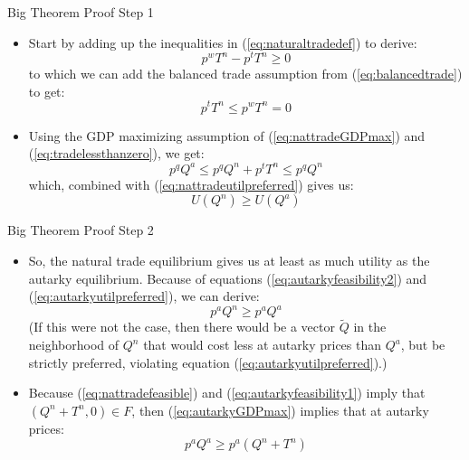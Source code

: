 \documentclass[aspectratio=169]{beamer}
\begin{document}
\begin{frame}{Big Theorem Proof Step 1}

    \begin{itemize}
        \item<1->  Start by adding up the inequalities in (\ref{eq:naturaltradedef}) to derive:
        \begin{equation}
            p^{w} T^{n} - p^{t} T^{n} \ge 0
            \label{eq:naturaltradevector}
        \end{equation}
        to which we can add the balanced trade assumption from (\ref{eq:balancedtrade}) to get:
        \begin{equation}
            p^{t} T^{n} \le p^{w} T^{n} = 0
            \label{eq:tradelessthanzero}
        \end{equation}
        \item<2-> Using the GDP maximizing assumption of (\ref{eq:nattradeGDPmax}) and (\ref{eq:tradelessthanzero}), we get:
        \begin{equation*}
            p^{q} Q^{a} \le p^{q} Q^{n} + p^{t} T^{n} \le p^{q} Q^{n}
        \end{equation*}
        which, combined with (\ref{eq:nattradeutilpreferred}) gives us:
        \begin{equation*}
            U\left( Q^{n} \right) \ge U\left( Q^{a} \right)
        \end{equation*}
    \end{itemize}
    
\end{frame}


\begin{frame}{Big Theorem Proof Step 2}

\begin{itemize}
    \item<1-> So, the natural trade equilibrium gives us at least as much utility as the autarky equilibrium.  Because of equations (\ref{eq:autarkyfeasibility2}) and (\ref{eq:autarkyutilpreferred}), we can derive:
    \begin{equation}
        p^{a} Q^{n} \ge p^{a} Q^{a}
        \label{eq:autarkypricesconsumption}
    \end{equation}
    (If this were not the case, then there would be a vector $ \widetilde{Q} $ in the neighborhood of $ Q^n $ that would cost less at autarky prices than $ Q^a $, but be strictly preferred, violating equation (\ref{eq:autarkyutilpreferred}).)
    \item<2-> Because (\ref{eq:nattradefeasible}) and (\ref{eq:autarkyfeasibility1}) imply that $ \left( Q^{n} + T^{n}, 0 \right) \in F $, then (\ref{eq:autarkyGDPmax}) implies that at autarky prices:
    \begin{equation}
        p^{a} Q^{a} \ge p^{a} \left( Q^{n} + T^{n} \right)
        \label{eq:autarkypricesinequality}
    \end{equation}
\end{itemize}
    
\end{frame}
\end{document}
